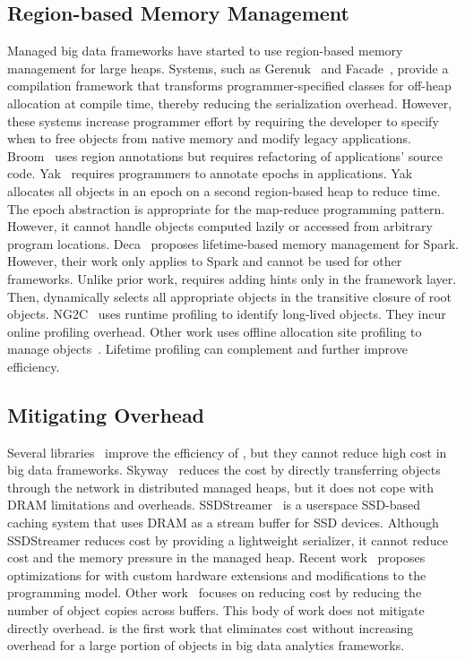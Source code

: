 \subsection{Region-based Memory Management}
Managed big data frameworks have started to use region-based memory
management for large heaps. Systems, such as
Gerenuk~\cite{navasca:gerenuk} and Facade~\cite{nguyen:facade},
provide a compilation framework that transforms programmer-specified
classes for off-heap allocation at compile time, thereby reducing the
serialization overhead. However, these systems increase programmer
effort by requiring the developer to specify when to free objects from
native memory and modify legacy applications. Broom~\cite{gog:broom}
uses region annotations but requires refactoring of applications'
source code. Yak~\cite{khanh:yak} requires programmers to annotate
epochs in applications. Yak allocates all objects in an epoch on a
second region-based heap to reduce \teraheapGC time. The epoch abstraction is
appropriate for the map-reduce programming pattern. However, it cannot
handle objects computed lazily or accessed from arbitrary program
locations. Deca~\cite{lu:deca} proposes lifetime-based memory
management for Spark. However, their work only applies to Spark and
cannot be used for other frameworks. Unlike prior work, \teraheapName{}
requires adding hints only in the framework layer. Then, \teraheapName{}
dynamically selects all appropriate objects in the transitive closure
of root objects. NG2C~\cite{bruno:n2gc} uses runtime profiling to
identify long-lived objects. They incur online profiling overhead.
Other work uses offline allocation site profiling to manage
objects~\cite{pretenuring,Blackburn:2001:PJ}. Lifetime profiling can
complement \teraheapName{} and further improve efficiency.

\subsection{Mitigating \teraheapSD Overhead}
Several libraries~\cite{thrift,kryo,protocol-buffers} improve the
efficiency of \teraheapSD, but they cannot reduce high \teraheapGC cost in big data
frameworks. Skyway~\cite{nguyen:skyway} reduces the \teraheapSD cost by
directly transferring objects through the network in distributed
managed heaps, but it does not cope with DRAM limitations and \teraheapGC
overheads. SSDStreamer~\cite{ssdstreamer} is a userspace SSD-based
caching system that uses DRAM as a stream buffer for SSD devices.
Although SSDStreamer reduces \teraheapSD cost by providing a lightweight
serializer, it cannot reduce \teraheapGC cost and the memory pressure in the
managed heap. Recent work~\cite{jang:arch, pourhabibi:optimus}
proposes optimizations for \teraheapSD with custom hardware extensions and
modifications to the programming model. Other
work~\cite{matei:champions, taranov:naos, ibanez:zerializer} focuses
on reducing \teraheapSD cost by reducing the number of object copies across
buffers. This body of work does not mitigate directly \teraheapGC overhead.
\teraheapName{} is the first work that eliminates \teraheapSD cost without increasing
\teraheapGC overhead for a large portion of objects in big data analytics
frameworks.

